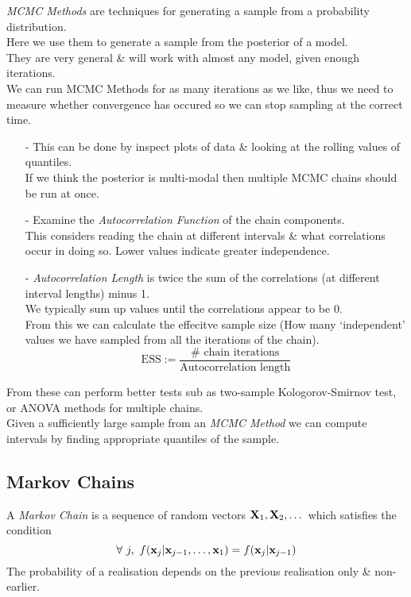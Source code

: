 \documentclass[11pt,a4paper]{article}
\begin{document}
\textit{MCMC Methods} are techniques for generating a sample from a probability distribution.\\
Here we use them to generate a sample from the posterior of a model.\\
They are very general \& will work with almost any model, given enough iterations.\\

We can run MCMC Methods for as many iterations as we like, thus we need to measure whether convergence has occured so we can stop sampling at the correct time.
\begin{itemize}
	\item[-] This can be done by inspect plots of data \& looking at the rolling values of quantiles.\\
	\nb If we think the posterior is multi-modal then multiple MCMC chains should be run at once.
	\item[-] Examine the \textit{Autocorrelation Function} of the chain components.\\
	This considers reading the chain at different intervals \& what correlations occur in doing so. Lower values indicate greater independence.
	\item[-] \textit{Autocorrelation Length} is twice the sum of the correlations (at different interval lengths) minus 1.\\
	We typically sum up values until the correlations appear to be 0.\\
	From this we can calculate the effecitve sample size (\ie How many `independent' values we have sampled from all the iterations of the chain).
	$$\text{ESS}:=\frac{\#\text{ chain iterations}}{\text{Autocorrelation length}}$$
\end{itemize}
From these can perform better tests sub as two-sample Kologorov-Smirnov test, or ANOVA methods for multiple chains.\\

Given a sufficiently large sample from an \textit{MCMC Method} we can compute intervals by finding appropriate quantiles of the sample.

\subsection{Markov Chains}

A \textit{Markov Chain} is a sequence of random vectors $\textbf{X}_1,\textbf{X}_2,\dots$ which satisfies the condition
$$\forall\ j,\ f(\x_j|\x_{j-1},\dots,\x_1)=f(\x_j|\x_{j-1})$$
\ie The probability of a realisation depends on the previous realisation only \& non-earlier.\\
\end{document}
